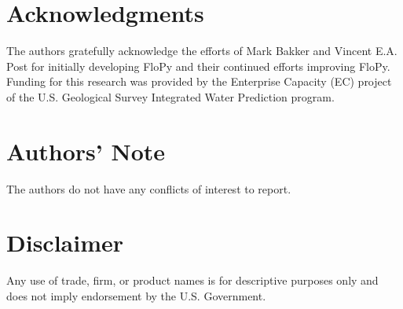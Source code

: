 \documentclass[12pt, oneside]{article}  	%
\begin{document}
\section*{Acknowledgments}
The authors gratefully acknowledge the efforts of Mark Bakker and Vincent E.A. Post for initially developing FloPy and their continued efforts improving FloPy. Funding for this research was provided by the Enterprise Capacity (EC) project of the U.S. Geological Survey Integrated Water Prediction program.

\section*{Authors' Note}
The authors do not have any conflicts of interest to report.

\section*{Disclaimer}
Any use of trade, firm, or product names is for descriptive purposes only and does not imply endorsement by the U.S. Government.




\begingroup
	\renewcommand{\listfigurename}{Figure captions}
	\listoffigures
\endgroup
\end{document}

